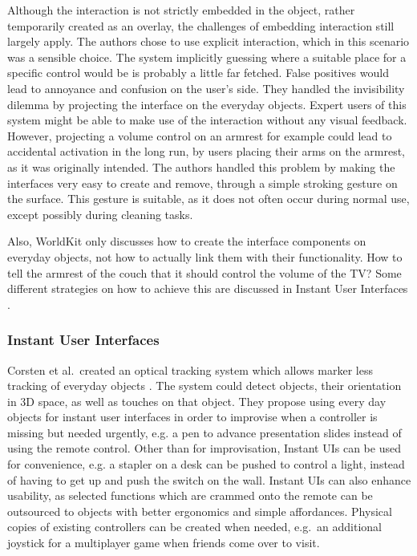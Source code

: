 Although the interaction is not strictly embedded in the object, rather temporarily created as an overlay, the challenges of embedding interaction still largely apply.
The authors chose to use explicit interaction, which in this scenario was a sensible choice.
The system implicitly guessing where a suitable place for a specific control would be is probably a little far fetched. 
False positives would lead to annoyance and confusion on the user's side.
They handled the invisibility dilemma by projecting the interface on the everyday objects.
Expert users of this system might be able to make use of the interaction without any visual feedback. However, projecting a volume control on an armrest for example could lead to accidental activation in the long run, by users placing their arms on the armrest, as it was originally intended.
The authors handled this problem by making the interfaces very easy to create and remove, through a simple stroking gesture on the surface.
This gesture is suitable, as it does not often occur during normal use, except possibly during cleaning tasks.

Also, WorldKit only discusses how to create the interface components on everyday objects, not how to actually link them with their functionality. 
How to tell the armrest of the couch that it should control the volume of the TV? 
Some different strategies on how to achieve this are discussed in Instant User Interfaces \cite{corsten13}.

\subsubsection{Instant User Interfaces}
\label{sec:worldKit}
Corsten et al.\ created an optical tracking system which allows marker less tracking of everyday objects \cite{corsten13}.
The system could detect objects, their orientation in 3D space, as well as touches on that object. 
They propose using every day objects for instant user interfaces in order to improvise when a controller is missing but needed urgently, e.g. a pen to advance presentation slides instead of using the remote control.
Other than for improvisation, Instant UIs can be used for convenience, e.g. a stapler on a desk can be pushed to control a light, instead of having to get up and push the switch on the wall.
Instant UIs can also enhance usability, as selected functions which are crammed onto the remote can be outsourced to objects with better ergonomics and simple affordances.
Physical copies of existing controllers can be created when needed, e.g.\ an additional joystick for a multiplayer game when friends come over to visit.

